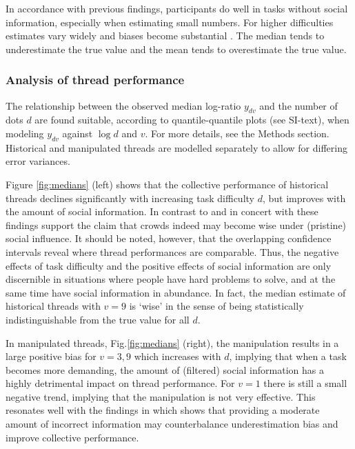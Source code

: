 \documentclass[9pt,a4paper,twocolumn,lineno]{article}
\begin{document}
In accordance with previous findings, participants do well in tasks without social information, especially when estimating small numbers. For higher difficulties estimates vary widely and biases become substantial \cite{indow1977scaling, izard2008calibrating, krueger1982single, krueger1984perceived, kao2018counteracting}. The median tends to underestimate the true value and the mean tends to overestimate the true value. %

\subsubsection*{Analysis of thread performance}
The relationship between the observed median log-ratio $y_{dv}$ and the number of dots $d$ are found suitable, according to quantile-quantile plots (see SI-text), when modeling $y_{dv}$ against $\log{d}$ and $v$. %
For more details, see the Methods section. Historical and manipulated threads are modelled separately to allow for differing error variances.

Figure \ref{fig:medians} (left) shows that the collective performance of historical threads declines significantly with increasing task difficulty $d$, but improves with the amount of social information. In contrast to \cite{lorenz2011social, king2011true, minson2012cost} and in concert with \cite{gurccay2015power, becker2017network, jayles2017social, farrell2011social} these findings support the claim that crowds indeed may become wise under (pristine) social influence. It should be noted, however, that the overlapping confidence intervals reveal where thread performances are comparable. Thus, the negative effects of task difficulty and the positive effects of social information are only discernible in situations where people have hard problems to solve, and at the same time have social information in abundance. In fact, the median estimate of historical threads with $v=9$ is `wise' in the sense of being statistically indistinguishable from the true value for all $d$.

In manipulated threads, Fig.\ref{fig:medians} (right), the manipulation results in a large positive bias for $v=3,9$ which increases with $d$, implying that when a task becomes more demanding, the amount of (filtered) social information has a highly detrimental impact on thread performance. For $v=1$ there is still a small negative trend, implying that the manipulation is not very effective. This resonates well with the findings in \cite{jayles2017social} which shows that providing a moderate amount of incorrect information may counterbalance underestimation bias and improve collective performance.
\end{document}
